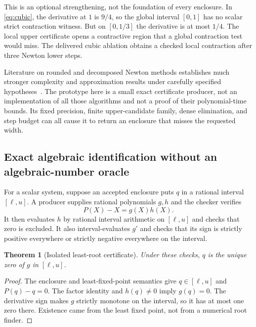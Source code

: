 \documentclass[11pt,a4paper]{article}
\newtheorem{theorem}{Theorem}[section]
\theoremstyle{definition}\newtheorem{definition}[theorem]{Definition}
\theoremstyle{remark}\newtheorem{remark}[theorem]{Remark}
\begin{document}
This is an optional strengthening, not the foundation of every enclosure. In \eqref{eq:cubic}, the derivative at $1$ is $9/4$, so the global interval $[0,1]$ has no scalar strict contraction witness. But on $[0,1/3]$ the derivative is at most $1/4$. The local upper certificate opens a contractive region that a global contraction test would miss. The delivered cubic ablation obtains a checked local contraction after three Newton lower steps.

Literature on rounded and decomposed Newton methods establishes much stronger complexity and approximation results under carefully specified hypotheses~\cite{esparza-kiefer-luttenberger,etessami-stewart-yannakakis,stewart-etessami-yannakakis}. The prototype here is a small exact certificate producer, not an implementation of all those algorithms and not a proof of their polynomial-time bounds. Its fixed precision, finite upper-candidate family, dense elimination, and step budget can all cause it to return an enclosure that misses the requested width.

\subsection{Exact algebraic identification without an algebraic-number oracle}
\label{sec:algebraic}
For a scalar system, suppose an accepted enclosure puts $q$ in a rational interval $[\ell,u]$. A producer supplies rational polynomials $g,h$ and the checker verifies
\begin{equation}
 \label{eq:factor}
 P(X)-X=g(X)h(X).
\end{equation}
It then evaluates $h$ by rational interval arithmetic on $[\ell,u]$ and checks that zero is excluded. It also interval-evaluates $g'$ and checks that its sign is strictly positive everywhere or strictly negative everywhere on the interval.

\begin{theorem}[Isolated least-root certificate]
\label{thm:algebraic}
Under these checks, $q$ is the unique zero of $g$ in $[\ell,u]$.
\end{theorem}
\begin{proof}
The enclosure and least-fixed-point semantics give $q\in[\ell,u]$ and $P(q)-q=0$. The factor identity and $h(q)\ne0$ imply $g(q)=0$. The derivative sign makes $g$ strictly monotone on the interval, so it has at most one zero there. Existence came from the least fixed point, not from a numerical root finder.
\end{proof}
\end{document}
